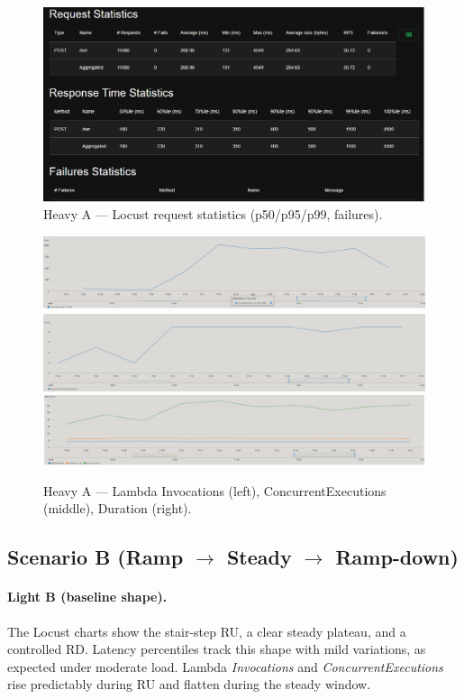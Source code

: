 \documentclass[11pt,a4paper]{article}
\begin{document}
\begin{figure}[h!] \centering
  \includegraphics[width=\linewidth]{"figures/hA - Stats.png"}
  \caption{Heavy A --- Locust request statistics (p50/p95/p99, failures).}
\end{figure}

\begin{figure}[h!] \centering
  \includegraphics[width=.32\linewidth]{"figures/hA - Invocations.png"}\hfill
  \includegraphics[width=.32\linewidth]{"figures/hA - ConcEx.png"}\hfill
  \includegraphics[width=.32\linewidth]{"figures/hA - Durations.png"}
  \caption{Heavy A --- Lambda Invocations (left), ConcurrentExecutions (middle), Duration (right).}
\end{figure}

\subsection{Scenario B (Ramp $\rightarrow$ Steady $\rightarrow$ Ramp-down)}\label{subsec:resB}

\paragraph{Light B (baseline shape).}
The Locust charts show the stair-step RU, a clear steady plateau, and a controlled RD. Latency percentiles track this shape with mild variations, as expected under moderate load. Lambda \emph{Invocations} and \emph{ConcurrentExecutions} rise predictably during RU and flatten during the steady window.
\end{document}
